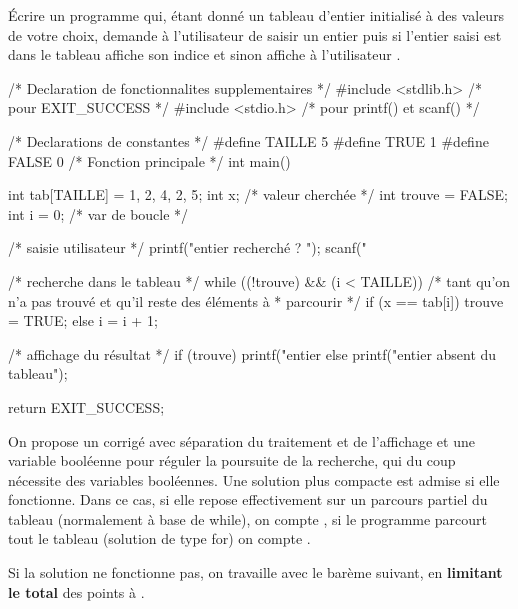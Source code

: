 \question Écrire un programme qui, étant donné un tableau d'entier
initialisé à des valeurs de votre choix, demande à l'utilisateur de
saisir un entier puis si l'entier saisi est dans le tableau affiche son indice
et sinon affiche à l'utilisateur . 
\begin{correction}
  \begin{listing}{1}
/* Declaration de fonctionnalites supplementaires */
#include <stdlib.h> /* pour EXIT_SUCCESS */
#include <stdio.h> /* pour printf() et scanf() */

/* Declarations de constantes */
#define TAILLE 5
#define TRUE 1
#define FALSE 0
/* Fonction principale */
int main()
{
    int tab[TAILLE] = {1, 2, 4, 2, 5};
    int x; /* valeur cherchée */
    int trouve = FALSE;
    int i = 0; /* var de boucle */
 
    /* saisie utilisateur */
    printf("entier recherché ? ");
    scanf("%

    /* recherche dans le tableau */
    while ((!trouve) && (i < TAILLE)) 
    /* tant qu'on n'a pas trouvé et qu'il reste des éléments à
     * parcourir */
    {
	if (x == tab[i])
	{
	    trouve = TRUE;
	}
	else
	{
	    i = i + 1;
	}
    } 

    /* affichage du résultat */
    if (trouve)
    {
	printf("entier %
    }
    else
    {
	printf("entier absent du tableau\n");
    }

    return EXIT_SUCCESS;
}
\end{listing}
\begin{baremeenv}
  On propose un corrigé avec séparation du traitement et de
  l'affichage et une variable booléenne pour réguler la poursuite de
  la recherche, qui du coup nécessite des variables booléennes. Une
  solution plus compacte est admise si elle fonctionne. Dans ce cas,
  si elle repose effectivement sur un parcours partiel du tableau
  (normalement à base
  de while), on compte , si le
  programme parcourt tout le tableau (solution de type for) on compte .

 Si la solution ne fonctionne pas, on travaille avec le barème
 suivant, en \textbf{limitant le total} des points à .

 \begin{description}


\end{description}
\end{baremeenv}
\end{correction}
